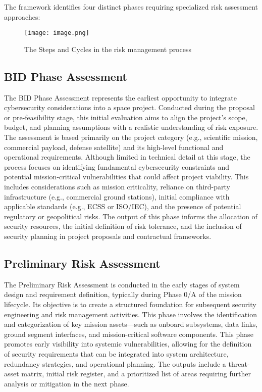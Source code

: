 \documentclass[binding=0.6cm]{sapthesis}
\begin{document}
The framework identifies four distinct phases requiring specialized risk assessment approaches:
\begin{figure}
    \centering
    \texttt{[image: image.png]}
    \caption{The Steps and Cycles in the risk management process}
    \label{fig:enter-label}
\end{figure}

\subsection{BID Phase Assessment}
The BID Phase Assessment represents the earliest opportunity to integrate cybersecurity considerations into a space project. Conducted during the proposal or pre-feasibility stage, this initial evaluation aims to align the project’s scope, budget, and planning assumptions with a realistic understanding of risk exposure. The assessment is based primarily on the project category (e.g., scientific mission, commercial payload, defense satellite) and its high-level functional and operational requirements. Although limited in technical detail at this stage, the process focuses on identifying fundamental cybersecurity constraints and potential mission-critical vulnerabilities that could affect project viability. This includes considerations such as mission criticality, reliance on third-party infrastructure (e.g., commercial ground stations), initial compliance with applicable standards (e.g., ECSS or ISO/IEC), and the presence of potential regulatory or geopolitical risks. The output of this phase informs the allocation of security resources, the initial definition of risk tolerance, and the inclusion of security planning in project proposals and contractual frameworks.

\subsection{Preliminary Risk Assessment}
The Preliminary Risk Assessment is conducted in the early stages of system design and requirement definition, typically during Phase 0/A of the mission lifecycle. Its objective is to create a structured foundation for subsequent security engineering and risk management activities. This phase involves the identification and categorization of key mission assets—such as onboard subsystems, data links, ground segment interfaces, and mission-critical software components. This phase promotes early visibility into systemic vulnerabilities, allowing for the definition of security requirements that can be integrated into system architecture, redundancy strategies, and operational planning. The outputs include a threat-asset matrix, initial risk register, and a prioritized list of areas requiring further analysis or mitigation in the next phase.
\end{document}
